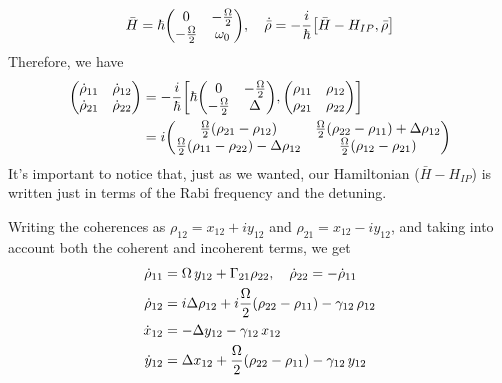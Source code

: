 \begin{align}
	\bar{H} = \hbar \mqty( 0 & -\frac{\Omega}{2} \\ -\frac{\Omega}{2} & \omega_{0} )
	 \qc \dot{\bar{\rho}} = -\frac{i}{\hbar} \comm{\bar{H} - H_{IP}}{\bar{\rho}}
\end{align}
Therefore, we have
\begin{align*}
	\mqty( \dot{\rho}_{11} & \dot{\rho}_{12} \\ \dot{\rho}_{21} & \dot{\rho}_{22}) &= - \frac{i}{\hbar} \comm{\hbar \mqty( 0 & -\frac{\Omega}{2} \\ -\frac{\Omega}{2} & \Delta )}{\mqty( \rho_{11} & \rho_{12} \\ \rho_{21} & \rho_{22})} \\
	&= i \mqty( \frac{\Omega}{2}(\rho_{21} - \rho_{12}) & \frac{\Omega}{2}(\rho_{22} - \rho_{11}) + \Delta \rho_{12} \\ \frac{\Omega}{2}(\rho_{11} - \rho_{22}) - \Delta \rho_{12} & \frac{\Omega}{2}(\rho_{12} - \rho_{21}) )
\end{align*}
It's important to notice that, just as we wanted, our Hamiltonian ($\bar{H} - H_{IP}$) is written just in terms of the Rabi frequency and the detuning.

Writing the coherences as $\rho_{12} = x_{12} + i y_{12}$ and $\rho_{21} = x_{12} - i y_{12}$, and taking into account both the coherent and incoherent terms, we get
\begin{subequations}
\begin{align}
	\dot{\rho}_{11} &= \Omega \, y_{12} + \Gamma_{21} \rho_{22} \qc \dot{\rho}_{22} = - \dot{\rho}_{11} \\
	\dot{\rho}_{12} &= i \Delta \rho_{12} + i\frac{\Omega}{2} (\rho_{22} - \rho_{11}) - \gamma_{12} \, \rho_{12} \\
	\dot{x}_{12} &= - \Delta y_{12} - \gamma_{12} \, x_{12} \\
	\dot{y}_{12} &= \Delta x_{12} + \frac{\Omega}{2} (\rho_{22} - \rho_{11}) - \gamma_{12} \, y_{12}
\end{align}
\end{subequations}


